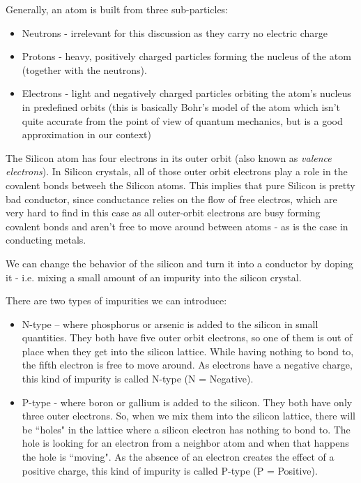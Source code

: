 Generally, an atom is built from three sub-particles:
\begin{itemize}
    \item Neutrons - irrelevant for this discussion as they carry no electric charge
    \item Protons - heavy, positively charged particles forming the nucleus of the atom (together with the neutrons).
    \item Electrons - light and negatively charged particles orbiting the atom's nucleus in predefined orbits (this is basically Bohr's model of the atom which isn't quite accurate from the point of view of quantum mechanics, but is a good approximation in our context)
\end{itemize}

The Silicon atom has four electrons in its outer orbit (also known as \textit{valence electrons}).
In Silicon crystals, all of those outer orbit electrons play a role in the covalent bonds betweeh the Silicon atoms.
This implies that pure Silicon is pretty bad conductor, 
since conductance relies on the flow of free electros,
which are very hard to find in this case as all outer-orbit electrons are busy forming covalent bonds and aren't free to move around between atoms - as is the case in conducting metals.

We can change the behavior of the silicon and turn it into a conductor by doping it - i.e. mixing a small amount of an impurity into the silicon crystal.

There are two types of impurities we can introduce:
\begin{itemize}
    \item N-type – where phosphorus or arsenic is added to the silicon in small
    quantities. They both have five outer orbit electrons, so one of them is out of
    place when they get into the silicon lattice. While having nothing to bond
    to, the fifth electron is free to move around. As electrons have a negative
    charge, this kind of impurity is called N-type (N = Negative).
    \item P-type - where boron or gallium is added to the silicon. They both
    have only three outer electrons. So, when we mix them into the silicon
    lattice, there will be ``holes" in the lattice where a silicon electron has
    nothing to bond to. The hole is looking for an electron from a neighbor atom
    and when that happens the hole is ``moving". As the absence of an electron
    creates the effect of a positive charge, this kind of impurity is called
    P-type (P = Positive).
\end{itemize}

